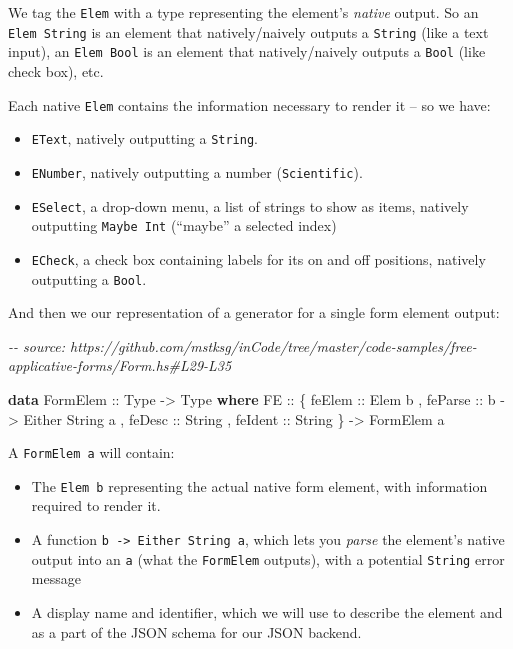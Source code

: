 \documentclass[]{article}
\newenvironment{Shaded}{}{}
\newcommand{\CommentTok}[1]{\textcolor[rgb]{0.38,0.63,0.69}{\textit{#1}}}
\newcommand{\DataTypeTok}[1]{\textcolor[rgb]{0.56,0.13,0.00}{#1}}
\newcommand{\KeywordTok}[1]{\textcolor[rgb]{0.00,0.44,0.13}{\textbf{#1}}}
\newcommand{\NormalTok}[1]{#1}
\newcommand{\OtherTok}[1]{\textcolor[rgb]{0.00,0.44,0.13}{#1}}
\begin{document}
We tag the \texttt{Elem} with a type representing the element's \emph{native}
output. So an \texttt{Elem\ String} is an element that natively/naively outputs
a \texttt{String} (like a text input), an \texttt{Elem\ Bool} is an element that
natively/naively outputs a \texttt{Bool} (like check box), etc.

Each native \texttt{Elem} contains the information necessary to render it -- so
we have:

\begin{itemize}
\tightlist
\item
  \texttt{EText}, natively outputting a \texttt{String}.
\item
  \texttt{ENumber}, natively outputting a number (\texttt{Scientific}).
\item
  \texttt{ESelect}, a drop-down menu, a list of strings to show as items,
  natively outputting \texttt{Maybe\ Int} (``maybe'' a selected index)
\item
  \texttt{ECheck}, a check box containing labels for its on and off positions,
  natively outputting a \texttt{Bool}.
\end{itemize}

And then we our representation of a generator for a single form element output:

\begin{Shaded}
\begin{Highlighting}[]
\CommentTok{{-}{-} source: https://github.com/mstksg/inCode/tree/master/code{-}samples/free{-}applicative{-}forms/Form.hs\#L29{-}L35}

\KeywordTok{data} \DataTypeTok{FormElem}\OtherTok{ ::} \DataTypeTok{Type} \OtherTok{{-}>} \DataTypeTok{Type} \KeywordTok{where}
    \DataTypeTok{FE}\OtherTok{ ::}\NormalTok{ \{}\OtherTok{ feElem  ::} \DataTypeTok{Elem}\NormalTok{ b}
\NormalTok{          ,}\OtherTok{ feParse ::}\NormalTok{ b }\OtherTok{{-}>} \DataTypeTok{Either} \DataTypeTok{String}\NormalTok{ a}
\NormalTok{          ,}\OtherTok{ feDesc  ::} \DataTypeTok{String}
\NormalTok{          ,}\OtherTok{ feIdent ::} \DataTypeTok{String}
\NormalTok{          \}}
        \OtherTok{{-}>} \DataTypeTok{FormElem}\NormalTok{ a}
\end{Highlighting}
\end{Shaded}

A \texttt{FormElem\ a} will contain:

\begin{itemize}
\tightlist
\item
  The \texttt{Elem\ b} representing the actual native form element, with
  information required to render it.
\item
  A function \texttt{b\ -\textgreater{}\ Either\ String\ a}, which lets you
  \emph{parse} the element's native output into an \texttt{a} (what the
  \texttt{FormElem} outputs), with a potential \texttt{String} error message
\item
  A display name and identifier, which we will use to describe the element and
  as a part of the JSON schema for our JSON backend.
\end{itemize}
\end{document}
